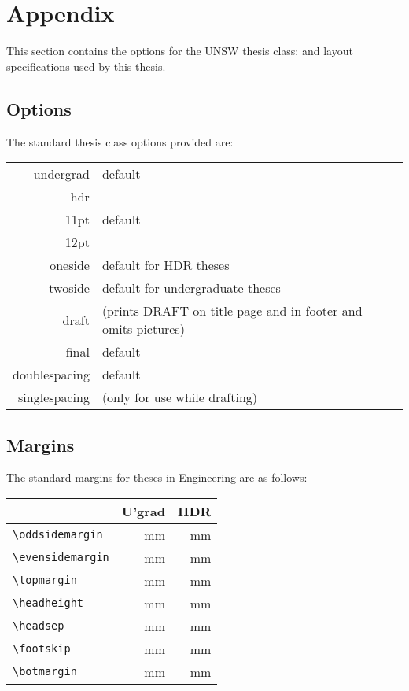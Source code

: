 \chapter{Appendix}\label{app1}

This section contains the options for the UNSW thesis class; and
layout specifications used by this thesis.

\section{Options}

The standard thesis class options provided are:

\qquad
\begin{tabular}{rl}
undergrad & default \\
hdr & \\[2ex]
11pt & default\\
12pt &\\[2ex]
oneside & default for HDR theses\\
twoside & default for undergraduate theses\\[2ex]
draft & (prints DRAFT on title page and in footer and omits pictures)\\
final & default\\[2ex]
doublespacing & default\\
singlespacing & (only for use while drafting)
\end{tabular}

\section{Margins}

The standard margins for theses in Engineering are as follows:

\qquad
\begin{tabular}{|l|r|r|}
\hline
 & U'grad & HDR\\\hline
{\verb+\oddsidemargin+} & \unit[40]{mm} & \unit[40]{mm}\\
{\verb+\evensidemargin+} & \unit[25]{mm} & \unit[20]{mm}\\
{\verb+\topmargin+} & \unit[25]{mm} & \unit[30]{mm}\\
{\verb+\headheight+} & \unit[40]{mm} & \unit[40]{mm}\\
{\verb+\headsep+} & \unit[40]{mm} & \unit[40]{mm}\\
{\verb+\footskip+} & \unit[15]{mm} & \unit[15]{mm}\\
{\verb+\botmargin+} & \unit[20]{mm} & \unit[20]{mm}\\
\hline
\end{tabular}

